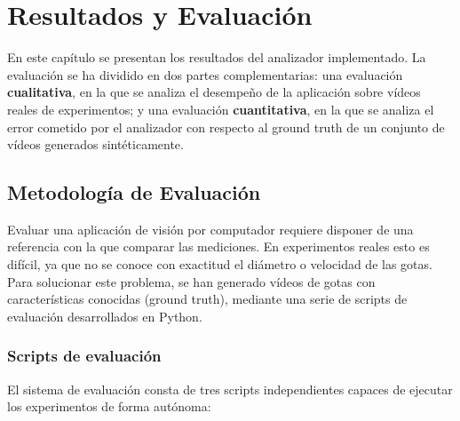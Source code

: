 
\chapter{Resultados y Evaluación} \label{chap:resultados}

En este capítulo se presentan los resultados del analizador implementado. La evaluación se ha dividido en dos partes complementarias: una evaluación \textbf{cualitativa}, en la que se analiza el desempeño de la aplicación sobre vídeos reales de experimentos; y una evaluación \textbf{cuantitativa}, en la que se analiza el error cometido por el analizador con respecto al ground truth de un conjunto de vídeos generados sintéticamente.

\section{Metodología de Evaluación}

Evaluar una aplicación de visión por computador requiere disponer de una referencia con la que comparar las mediciones. En experimentos reales esto es difícil, ya que no se conoce con exactitud el diámetro o velocidad de las gotas. Para solucionar este problema, se han generado vídeos de gotas con características conocidas (ground truth), mediante una serie de scripts de evaluación desarrollados en Python.

\subsection{Scripts de evaluación}

El sistema de evaluación consta de tres scripts independientes capaces de ejecutar los experimentos de forma autónoma:

